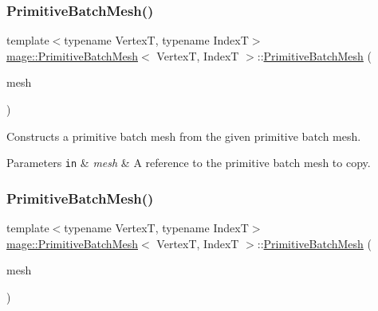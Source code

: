 \subsubsection{\texorpdfstring{Primitive\+Batch\+Mesh()}{PrimitiveBatchMesh()}\hspace{0.1cm}{\footnotesize\ttfamily [3/4]}}
{\footnotesize\ttfamily template$<$typename VertexT, typename IndexT$>$ \\
\hyperlink{classmage_1_1_primitive_batch_mesh}{mage\+::\+Primitive\+Batch\+Mesh}$<$ VertexT, IndexT $>$\+::\hyperlink{classmage_1_1_primitive_batch_mesh}{Primitive\+Batch\+Mesh} (\begin{DoxyParamCaption}\item[{const \hyperlink{classmage_1_1_primitive_batch_mesh}{Primitive\+Batch\+Mesh}$<$ VertexT, IndexT $>$ \&}]{mesh }\end{DoxyParamCaption})\hspace{0.3cm}{\ttfamily [delete]}}

Constructs a primitive batch mesh from the given primitive batch mesh.


\begin{DoxyParams}[1]{Parameters}
\mbox{\tt in}  & {\em mesh} & A reference to the primitive batch mesh to copy. \\
\hline
\end{DoxyParams}
\hypertarget{classmage_1_1_primitive_batch_mesh_aa3969f48e75e1c4e4351e971b86a88a6}{}\label{classmage_1_1_primitive_batch_mesh_aa3969f48e75e1c4e4351e971b86a88a6} 
\subsubsection{\texorpdfstring{Primitive\+Batch\+Mesh()}{PrimitiveBatchMesh()}\hspace{0.1cm}{\footnotesize\ttfamily [4/4]}}
{\footnotesize\ttfamily template$<$typename VertexT, typename IndexT$>$ \\
\hyperlink{classmage_1_1_primitive_batch_mesh}{mage\+::\+Primitive\+Batch\+Mesh}$<$ VertexT, IndexT $>$\+::\hyperlink{classmage_1_1_primitive_batch_mesh}{Primitive\+Batch\+Mesh} (\begin{DoxyParamCaption}\item[{\hyperlink{classmage_1_1_primitive_batch_mesh}{Primitive\+Batch\+Mesh}$<$ VertexT, IndexT $>$ \&\&}]{mesh }\end{DoxyParamCaption})\hspace{0.3cm}{\ttfamily [noexcept]}}

